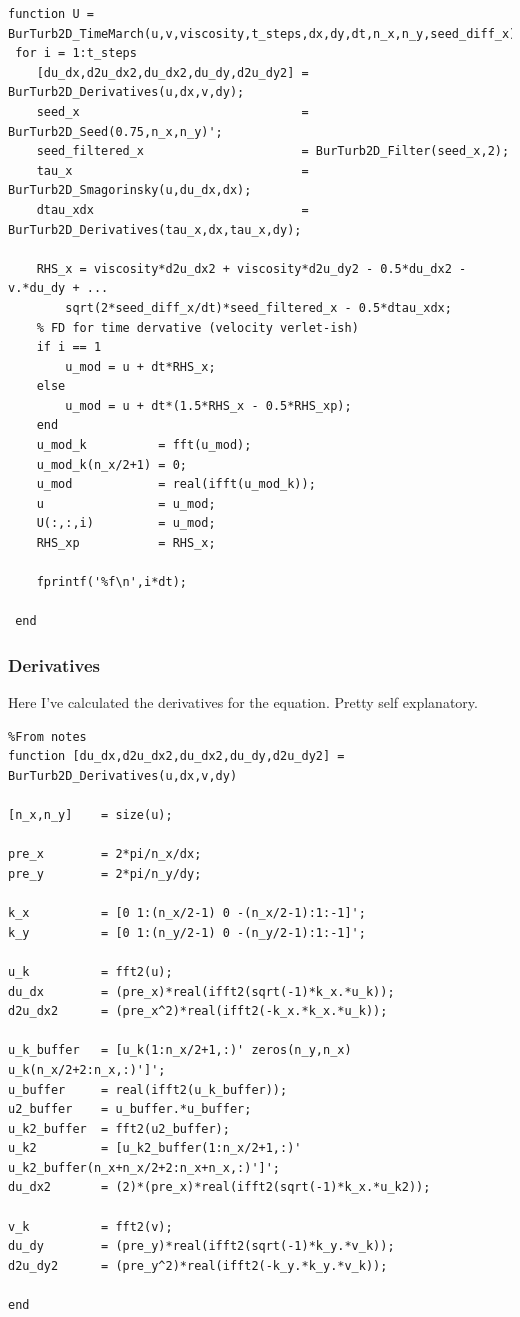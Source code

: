 \documentclass[12pt,twoside]{article}
\begin{document}
\vspace{50pt}

\begin{lstlisting}
function U = BurTurb2D_TimeMarch(u,v,viscosity,t_steps,dx,dy,dt,n_x,n_y,seed_diff_x)
 for i = 1:t_steps
    [du_dx,d2u_dx2,du_dx2,du_dy,d2u_dy2] = BurTurb2D_Derivatives(u,dx,v,dy);
    seed_x                               = BurTurb2D_Seed(0.75,n_x,n_y)';
    seed_filtered_x                      = BurTurb2D_Filter(seed_x,2);  
    tau_x                                = BurTurb2D_Smagorinsky(u,du_dx,dx);
    dtau_xdx                             = BurTurb2D_Derivatives(tau_x,dx,tau_x,dy);
    
    RHS_x = viscosity*d2u_dx2 + viscosity*d2u_dy2 - 0.5*du_dx2 - v.*du_dy + ...
        sqrt(2*seed_diff_x/dt)*seed_filtered_x - 0.5*dtau_xdx;
    % FD for time dervative (velocity verlet-ish)
    if i == 1
        u_mod = u + dt*RHS_x;                              
    else
        u_mod = u + dt*(1.5*RHS_x - 0.5*RHS_xp);             
    end
    u_mod_k          = fft(u_mod);
    u_mod_k(n_x/2+1) = 0;
    u_mod            = real(ifft(u_mod_k));
    u                = u_mod;
    U(:,:,i)         = u_mod;
    RHS_xp           = RHS_x;
     
    fprintf('%f\n',i*dt);
    
 end
\end{lstlisting}

\newpage

\subsubsection{Derivatives} \label{sec:derivatives}

Here I've calculated the derivatives for the equation. Pretty self explanatory.

\vspace{50pt}

\begin{lstlisting}
%From notes
function [du_dx,d2u_dx2,du_dx2,du_dy,d2u_dy2] = BurTurb2D_Derivatives(u,dx,v,dy)

[n_x,n_y]    = size(u);

pre_x        = 2*pi/n_x/dx;
pre_y        = 2*pi/n_y/dy;

k_x          = [0 1:(n_x/2-1) 0 -(n_x/2-1):1:-1]';
k_y          = [0 1:(n_y/2-1) 0 -(n_y/2-1):1:-1]';

u_k          = fft2(u);
du_dx        = (pre_x)*real(ifft2(sqrt(-1)*k_x.*u_k));
d2u_dx2      = (pre_x^2)*real(ifft2(-k_x.*k_x.*u_k));

u_k_buffer   = [u_k(1:n_x/2+1,:)' zeros(n_y,n_x) u_k(n_x/2+2:n_x,:)']';
u_buffer     = real(ifft2(u_k_buffer));
u2_buffer    = u_buffer.*u_buffer;
u_k2_buffer  = fft2(u2_buffer);
u_k2         = [u_k2_buffer(1:n_x/2+1,:)' u_k2_buffer(n_x+n_x/2+2:n_x+n_x,:)']';
du_dx2       = (2)*(pre_x)*real(ifft2(sqrt(-1)*k_x.*u_k2));

v_k          = fft2(v);
du_dy        = (pre_y)*real(ifft2(sqrt(-1)*k_y.*v_k));
d2u_dy2      = (pre_y^2)*real(ifft2(-k_y.*k_y.*v_k));

end
\end{lstlisting}
\end{document}
